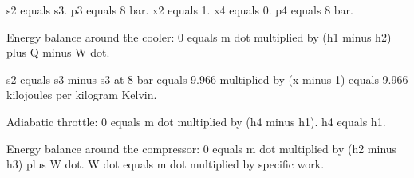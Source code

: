 s2 equals s3.  
p3 equals 8 bar.  
x2 equals 1.  
x4 equals 0.  
p4 equals 8 bar.  

Energy balance around the cooler:  
0 equals m dot multiplied by (h1 minus h2) plus Q minus W dot.  

s2 equals s3 minus s3 at 8 bar equals 9.966 multiplied by (x minus 1) equals 9.966 kilojoules per kilogram Kelvin.  

Adiabatic throttle:  
0 equals m dot multiplied by (h4 minus h1).  
h4 equals h1.  

Energy balance around the compressor:  
0 equals m dot multiplied by (h2 minus h3) plus W dot.  
W dot equals m dot multiplied by specific work.